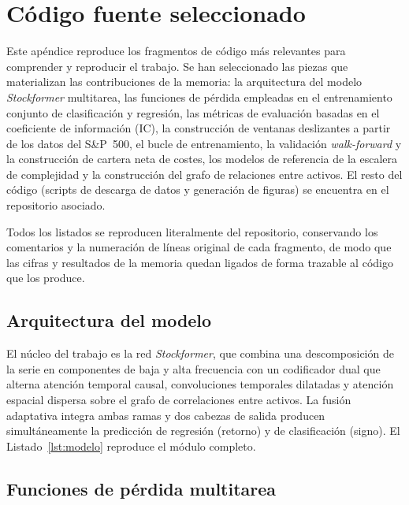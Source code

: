 \chapter{Código fuente seleccionado}\label{ap:codigo}

Este apéndice reproduce los fragmentos de código más relevantes para comprender y
reproducir el trabajo. Se han seleccionado las piezas que materializan las
contribuciones de la memoria: la arquitectura del modelo \emph{Stockformer}
multitarea, las funciones de pérdida empleadas en el entrenamiento conjunto de
clasificación y regresión, las métricas de evaluación basadas en el coeficiente de
información (IC), la construcción de ventanas deslizantes a partir de los datos del
S\&P~500, el bucle de entrenamiento, la validación \emph{walk-forward} y la
construcción de cartera neta de costes, los modelos de referencia de la escalera de
complejidad y la construcción del grafo de relaciones entre activos. El resto del
código (scripts de descarga de datos y generación de figuras) se encuentra en el
repositorio asociado.

Todos los listados se reproducen literalmente del repositorio, conservando los
comentarios y la numeración de líneas original de cada fragmento, de modo que las
cifras y resultados de la memoria quedan ligados de forma trazable al código que los
produce.

\section{Arquitectura del modelo}\label{sec:cod-modelo}

El núcleo del trabajo es la red \emph{Stockformer}, que combina una descomposición de
la serie en componentes de baja y alta frecuencia con un codificador dual que alterna
atención temporal causal, convoluciones temporales dilatadas y atención espacial
dispersa sobre el grafo de correlaciones entre activos. La fusión adaptativa integra
ambas ramas y dos cabezas de salida producen simultáneamente la predicción de
regresión (retorno) y de clasificación (signo). El Listado~\ref{lst:modelo} reproduce
el módulo completo.



\section{Funciones de pérdida multitarea}\label{sec:cod-loss}

